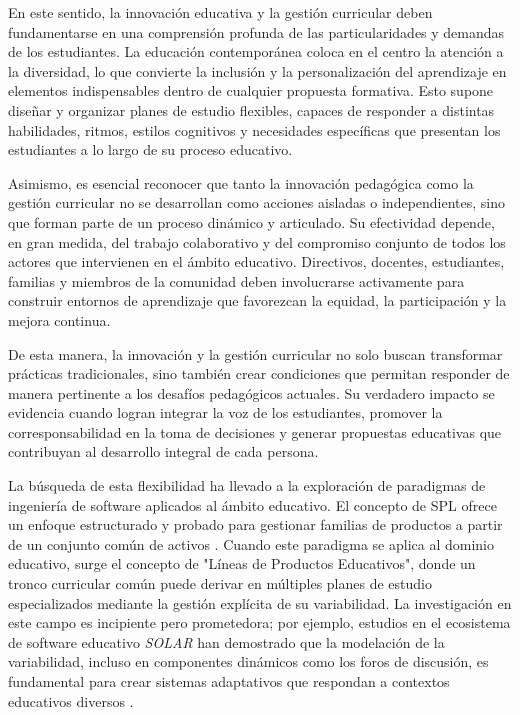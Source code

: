 {    En este sentido, la innovación educativa y la gestión curricular deben fundamentarse en una comprensión 
    profunda de las particularidades y demandas de los estudiantes. La educación contemporánea coloca en el centro 
    la atención a la diversidad, lo que convierte la inclusión y la personalización del aprendizaje en elementos 
    indispensables dentro de cualquier propuesta formativa. Esto supone diseñar y organizar planes de estudio flexibles, 
    capaces de responder a distintas habilidades, ritmos, estilos cognitivos y necesidades específicas que presentan 
    los estudiantes a lo largo de su proceso educativo.

    Asimismo, es esencial reconocer que tanto la innovación pedagógica como la gestión curricular no se desarrollan como 
    acciones aisladas o independientes, sino que forman parte de un proceso dinámico y articulado. 
    Su efectividad depende, en gran medida, del trabajo colaborativo y del compromiso conjunto de todos los actores que 
    intervienen en el ámbito educativo. Directivos, docentes, estudiantes, familias y miembros de la comunidad deben 
    involucrarse activamente para construir entornos de aprendizaje que favorezcan la equidad, la participación y 
    la mejora continua.

    De esta manera, la innovación y la gestión curricular no solo buscan transformar prácticas tradicionales, sino también 
    crear condiciones que permitan responder de manera pertinente a los desafíos pedagógicos actuales. 
    Su verdadero impacto se evidencia cuando logran integrar la voz de los estudiantes, promover la corresponsabilidad 
    en la toma de decisiones y generar propuestas educativas que contribuyan al desarrollo integral de cada persona.

    La búsqueda de esta flexibilidad ha llevado a la exploración de paradigmas de ingeniería de software aplicados
    al ámbito educativo. El concepto de \ac{SPL}
    ofrece un enfoque estructurado y probado para gestionar familias de productos
    a partir de un conjunto común de activos \citep{apel2013feature}. Cuando este
    paradigma se aplica al dominio educativo, surge el concepto de "Líneas de
    Productos Educativos", donde un tronco curricular común puede derivar en
    múltiples planes de estudio especializados mediante la gestión explícita de su
    variabilidad. La investigación en este campo es incipiente pero prometedora;
    por ejemplo, estudios en el ecosistema de software educativo \textit{SOLAR} han
    demostrado que la modelación de la variabilidad, incluso en componentes
    dinámicos como los foros de discusión, es fundamental para crear sistemas
    adaptativos que respondan a contextos educativos diversos \citep{guzman2022variabilidad}.

}
